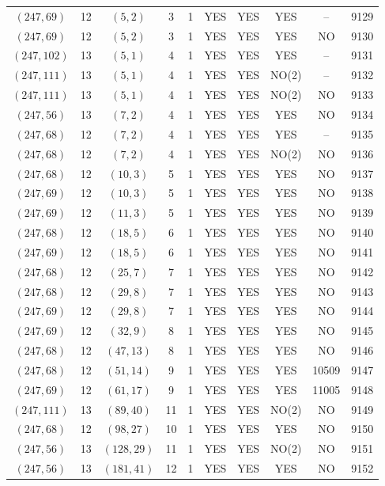 \begin{longtable}{|c|c|c|c|c|c|c|c|c|c|}
$(247, 69)$ & 12 & $(5, 2)$ & 3 & 1 & YES & YES & YES & -- & 9129\\
$(247, 69)$ & 12 & $(5, 2)$ & 3 & 1 & YES & YES & YES & NO & 9130\\
$(247, 102)$ & 13 & $(5, 1)$ & 4 & 1 & YES & YES & YES & -- & 9131\\
$(247, 111)$ & 13 & $(5, 1)$ & 4 & 1 & YES & YES & NO(2) & -- & 9132\\
$(247, 111)$ & 13 & $(5, 1)$ & 4 & 1 & YES & YES & NO(2) & NO & 9133\\
$(247, 56)$ & 13 & $(7, 2)$ & 4 & 1 & YES & YES & YES & NO & 9134\\
$(247, 68)$ & 12 & $(7, 2)$ & 4 & 1 & YES & YES & YES & -- & 9135\\
$(247, 68)$ & 12 & $(7, 2)$ & 4 & 1 & YES & YES & NO(2) & NO & 9136\\
$(247, 68)$ & 12 & $(10, 3)$ & 5 & 1 & YES & YES & YES & NO & 9137\\
$(247, 69)$ & 12 & $(10, 3)$ & 5 & 1 & YES & YES & YES & NO & 9138\\
$(247, 69)$ & 12 & $(11, 3)$ & 5 & 1 & YES & YES & YES & NO & 9139\\
$(247, 68)$ & 12 & $(18, 5)$ & 6 & 1 & YES & YES & YES & NO & 9140\\
$(247, 69)$ & 12 & $(18, 5)$ & 6 & 1 & YES & YES & YES & NO & 9141\\
$(247, 68)$ & 12 & $(25, 7)$ & 7 & 1 & YES & YES & YES & NO & 9142\\
$(247, 68)$ & 12 & $(29, 8)$ & 7 & 1 & YES & YES & YES & NO & 9143\\
$(247, 69)$ & 12 & $(29, 8)$ & 7 & 1 & YES & YES & YES & NO & 9144\\
$(247, 69)$ & 12 & $(32, 9)$ & 8 & 1 & YES & YES & YES & NO & 9145\\
$(247, 68)$ & 12 & $(47, 13)$ & 8 & 1 & YES & YES & YES & NO & 9146\\
$(247, 68)$ & 12 & $(51, 14)$ & 9 & 1 & YES & YES & YES & 10509 & 9147\\
$(247, 69)$ & 12 & $(61, 17)$ & 9 & 1 & YES & YES & YES & 11005 & 9148\\
$(247, 111)$ & 13 & $(89, 40)$ & 11 & 1 & YES & YES & NO(2) & NO & 9149\\
$(247, 68)$ & 12 & $(98, 27)$ & 10 & 1 & YES & YES & YES & NO & 9150\\
$(247, 56)$ & 13 & $(128, 29)$ & 11 & 1 & YES & YES & NO(2) & NO & 9151\\
$(247, 56)$ & 13 & $(181, 41)$ & 12 & 1 & YES & YES & YES & NO & 9152\\

\end{longtable}
